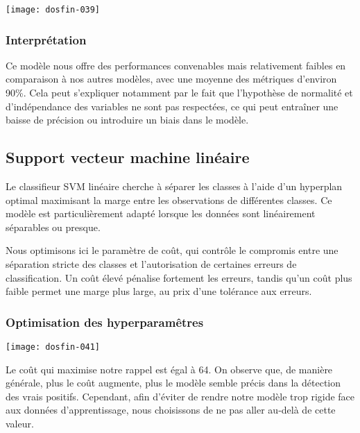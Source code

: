 \documentclass[a4paper,11pt]{article}
\begin{document}
\begin{center}

\texttt{[image: dosfin-039]}

\end{center}

\subsubsection{Interprétation}

Ce modèle nous offre des performances convenables mais relativement faibles en comparaison à nos autres modèles, avec une moyenne des métriques d’environ 90\%. Cela peut s’expliquer notamment par le fait que l’hypothèse de normalité et d'indépendance des variables ne sont pas respectées, ce qui peut entraîner une baisse de précision ou introduire un biais dans le modèle.


\newpage

\subsection{Support vecteur machine linéaire}

Le classifieur SVM linéaire cherche à séparer les classes à l’aide d’un hyperplan optimal maximisant la marge entre les observations de différentes classes. Ce modèle est particulièrement adapté lorsque les données sont linéairement séparables ou presque.

Nous optimisons ici le paramètre de coût, qui contrôle le compromis entre une séparation stricte des classes et l’autorisation de certaines erreurs de classification. Un coût élevé pénalise fortement les erreurs, tandis qu’un coût plus faible permet une marge plus large, au prix d’une tolérance aux erreurs.


\subsubsection{Optimisation des hyperparamêtres}



\begin{center}

\texttt{[image: dosfin-041]}

\end{center}

Le coût qui maximise notre rappel est égal à 64. On observe que, de manière générale, plus le coût augmente, plus le modèle semble précis dans la détection des vrais positifs. Cependant, afin d’éviter de rendre notre modèle trop rigide face aux données d’apprentissage, nous choisissons de ne pas aller au-delà de cette valeur.
\end{document}
